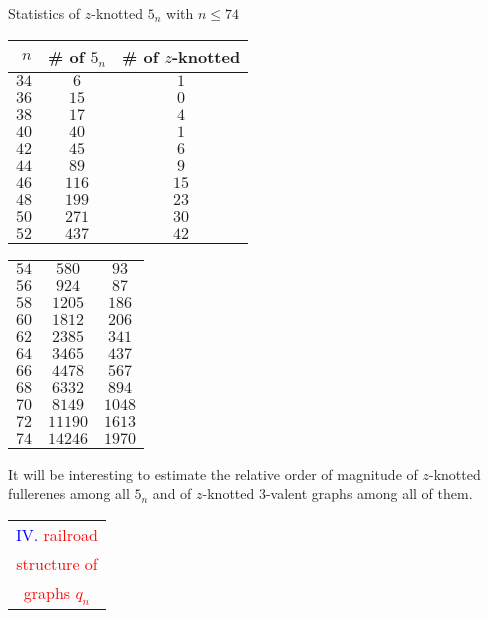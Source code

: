 \documentclass[%
pdf,
colorBG,
slideColor,
]{prosper}
\begin{document}
\begin{slide}{Statistics of $z$-knotted $5_n$ with $n\leq 74$}
\begin{center}
\begin{minipage}{4.5cm}
{\tiny
\begin{tabular}{|c||c|c|}
\hline
$\,\,n$  &\# of $5_n$&\# of $z$-knotted\\
\hline
$34$&    $6$&$1$\\
$36$&   $15$&$0$\\
$38$&   $17$&$4$\\
$40$&   $40$&$1$\\
$42$&   $45$&$6$\\
$44$&   $89$&$9$\\
$46$&  $116$&$15$\\
$48$&  $199$&$23$\\
$50$&  $271$&$30$\\
$52$&  $437$&$42$\\
\hline
\end{tabular}
}
\end{minipage}
\begin{minipage}{3.5cm}
{\tiny
\begin{tabular}{|c||c|c|}
\hline
$54$&  $580$&$93$\\
$56$&  $924$&$87$\\
$58$& $1205$&$186$\\
$60$& $1812$&$206$\\
$62$& $2385$&$341$\\
$64$& $3465$&$437$\\
$66$& $4478$&$567$\\
$68$& $6332$&$894$\\
$70$& $8149$&$1048$\\
$72$&$11190$&$1613$\\
$74$&$14246$&$1970$\\
\hline
\end{tabular}
}
\end{minipage}
\end{center}
It will be interesting to estimate the relative order of magnitude of $z$-knotted fullerenes among all $5_n$ and of $z$-knotted $3$-valent graphs among all of them.

\end{slide}





\begin{slide}{}
\begin{center}
{\Huge 
\begin{tabular*}{6cm}{c}
\\[-0.5cm]
\textcolor{blue}{IV. }\textcolor{red}{railroad}\\
\textcolor{red}{structure of}\\
\textcolor{red}{graphs $q_n$}
\end{tabular*}
}
\end{center}
\end{slide}
\end{document}
